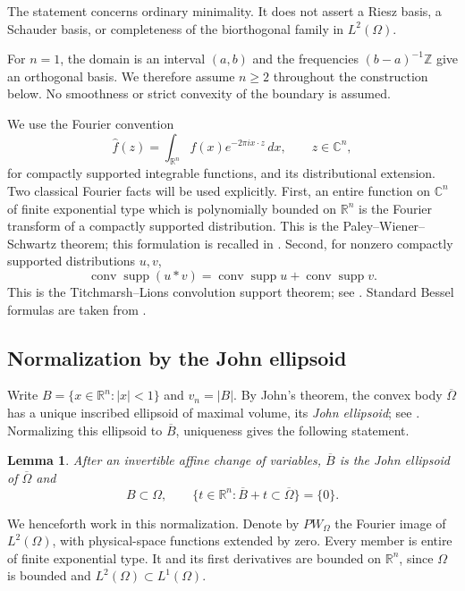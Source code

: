 \documentclass[a4paper,12pt,reqno]{amsart}
\newtheorem{lemma}[theorem]{Lemma}
\theoremstyle{remark}
\numberwithin{equation}{section}
\newcommand{\R}{\mathbb R}
\newcommand{\C}{\mathbb C}
\DeclareMathOperator{\supp}{supp}
\DeclareMathOperator{\conv}{conv}
\begin{document}
The statement concerns ordinary minimality. It does not assert a
Riesz basis, a Schauder basis, or completeness of the biorthogonal
family in $L^2(\Omega)$.

For $n=1$, the domain is an interval $(a,b)$ and the frequencies
$(b-a)^{-1}\mathbb Z$ give an orthogonal basis. We therefore assume
$n\geq2$ throughout the construction below. No smoothness or
strict convexity of the boundary is assumed.

We use the Fourier convention
\[
 \widehat f(z)=\int_{\R^n}f(x)e^{-2\pi ix\cdot z}\,dx,
 \qquad z\in\C^n,
\]
for compactly supported integrable functions, and its distributional
extension. Two classical Fourier facts will be used explicitly.
First, an entire function on $\C^n$ of finite exponential type
which is polynomially bounded on $\R^n$ is the Fourier transform
of a compactly supported distribution. This is the
Paley--Wiener--Schwartz theorem; this formulation is recalled in
\cite[Introduction, pp.~1--2]{Wiegerinck}.
Second, for nonzero compactly supported distributions $u,v$,
\begin{equation}\label{cm:eq:titchmarsh}
 \conv\supp(u*v)=\conv\supp u+\conv\supp v.
\end{equation}
This is the Titchmarsh--Lions convolution support theorem; see
\cite[Theorem 4.2]{Hormander}.
Standard Bessel formulas are taken from \cite{DLMF}.

\subsection{Normalization by the John ellipsoid}

Write $B=\{x\in\R^n:|x|<1\}$ and $v_n=|B|$.
By John's theorem, the convex body $\overline\Omega$ has a unique
inscribed ellipsoid of maximal volume, its \emph{John ellipsoid}; see
\cite[Theorem~3.1, p.~13]{BallConvexGeometry}.
Normalizing this ellipsoid to $\overline B$, uniqueness gives the
following statement.

\begin{lemma}\label{cm:lem:ellipse}
After an invertible affine change of variables, $\overline B$ is the
John ellipsoid of $\overline\Omega$ and
\begin{equation}\label{cm:eq:rigidity}
 B\subset\Omega,
 \qquad
 \{t\in\R^n:\overline B+t\subset\overline\Omega\}=\{0\}.
\end{equation}
\end{lemma}

We henceforth work in this normalization. Denote by $PW_\Omega$
the Fourier image of $L^2(\Omega)$, with physical-space functions
extended by zero. Every member is entire of finite exponential type.
It and its first derivatives are bounded on $\R^n$, since
$\Omega$ is bounded and $L^2(\Omega)\subset L^1(\Omega)$.
\end{document}

